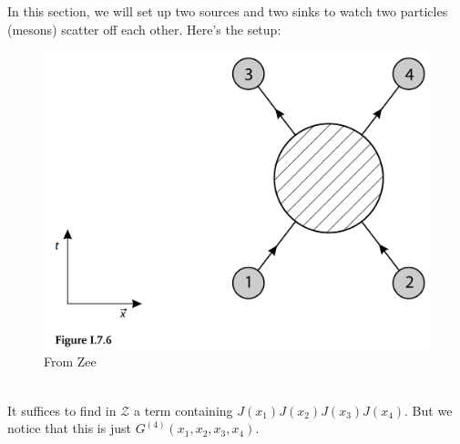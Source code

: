 \documentclass{book}
\theoremstyle{definition}
\newcommand{\Z}{\mathcal{Z}}
\begin{document}
In this section, we will set up two sources and two sinks to watch two particles (mesons) scatter off each other. Here's the setup:
\begin{figure}[!htb]
	\centering
	\includegraphics[scale=0.3]{mesons}
	\caption{From Zee}
\end{figure}\\

It suffices to find in $\Z$ a term containing $J(x_1)J(x_2)J(x_3)J(x_4)$. But we notice that this is just $G^{(4)}(x_1,x_2,x_3,x_4)$.\\
\end{document}
